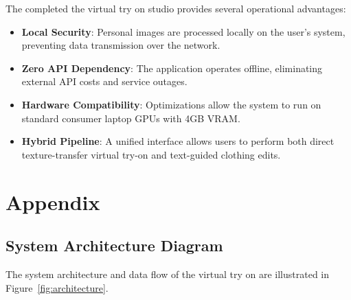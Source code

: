 \documentclass[12pt, a4paper]{report}
\begin{document}
The completed the virtual try on studio provides several operational advantages:
\begin{itemize}
\item \textbf{Local Security}: Personal images are processed locally on the user's system, preventing data transmission over the network.
\item \textbf{Zero API Dependency}: The application operates offline, eliminating external API costs and service outages.
\item \textbf{Hardware Compatibility}: Optimizations allow the system to run on standard consumer laptop GPUs with 4GB VRAM.
\item \textbf{Hybrid Pipeline}: A unified interface allows users to perform both direct texture-transfer virtual try-on and text-guided clothing edits.
\end{itemize}

\chapter{Appendix}

\section{System Architecture Diagram}

The system architecture and data flow of the virtual try on are illustrated in Figure~\ref{fig:architecture}.
\end{document}
